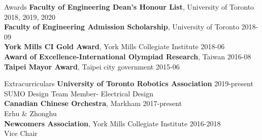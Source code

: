 \documentclass{my_resume} %
\begin{document}
    \begin{rSection}{Awards}
        {\bf Faculty of Engineering Dean's Honour List}, University of Toronto \hfill{2018, 2019, 2020} \\
        {\bf Faculty of Engineering Admission Scholarship}, University of Toronto \hfill{2018-09} \\
        {\bf York Mills CI Gold Award}, York Mills Collegiate Institute \hfill{2018-06}\\ 
        {\bf Award of Excellence-International Olympiad Research}, Taiwan \hfill{2016-08} \\
        {\bf Taipei Mayor Award}, Taipei city government \hfill{2015-06}
    \end{rSection}



    \begin{rSection}{Extracurriculars}
        {\bf University of Toronto Robotics Association} \hfill{2019-present}    \\        
        SUMO Design Team Member- Electrical Design\\
        {\bf Canadian Chinese Orchestra}, Markham  \hfill{2017-present}\\ 
        Erhu \& Zhonghu \\
        {\bf Newcomers Association}, York Mills Collegiate Institute \hfill{2016-2018}\\
        Vice Chair
    \end{rSection}
\end{document}
